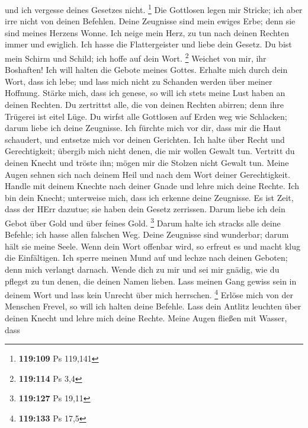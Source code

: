 und ich vergesse deines Gesetzes nicht. \footnote{\textbf{119:109} Ps
  119,141}  Die Gottlosen legen mir Stricke; ich aber irre
nicht von deinen Befehlen.  Deine Zeugnisse sind mein
ewiges Erbe; denn sie sind meines Herzens Wonne.  Ich
neige mein Herz, zu tun nach deinen Rechten immer und ewiglich.
 Ich hasse die Flattergeister und liebe dein Gesetz.
 Du bist mein Schirm und Schild; ich hoffe auf dein Wort.
\footnote{\textbf{119:114} Ps 3,4}  Weichet von mir, ihr
Boshaften! Ich will halten die Gebote meines Gottes. 
Erhalte mich durch dein Wort, dass ich lebe; und lass mich nicht zu
Schanden werden über meiner Hoffnung.  Stärke mich, dass
ich genese, so will ich stets meine Lust haben an deinen Rechten.
 Du zertrittst alle, die von deinen Rechten abirren; denn
ihre Trügerei ist eitel Lüge.  Du wirfst alle Gottlosen
auf Erden weg wie Schlacken; darum liebe ich deine Zeugnisse.
 Ich fürchte mich vor dir, dass mir die Haut schaudert,
und entsetze mich vor deinen Gerichten.  Ich halte über
Recht und Gerechtigkeit; übergib mich nicht denen, die mir wollen Gewalt
tun.  Vertritt du deinen Knecht und tröste ihn; mögen mir
die Stolzen nicht Gewalt tun.  Meine Augen sehnen sich
nach deinem Heil und nach dem Wort deiner Gerechtigkeit. 
Handle mit deinem Knechte nach deiner Gnade und lehre mich deine Rechte.
 Ich bin dein Knecht; unterweise mich, dass ich erkenne
deine Zeugnisse.  Es ist Zeit, dass der HErr dazutue; sie
haben dein Gesetz zerrissen.  Darum liebe ich dein Gebot
über Gold und über feines Gold. \footnote{\textbf{119:127} Ps 19,11}
 Darum halte ich stracks alle deine Befehle; ich hasse
allen falschen Weg.  Deine Zeugnisse sind wunderbar; darum
hält sie meine Seele.  Wenn dein Wort offenbar wird, so
erfreut es und macht klug die Einfältigen.  Ich sperre
meinen Mund auf und lechze nach deinen Geboten; denn mich verlangt
darnach.  Wende dich zu mir und sei mir gnädig, wie du
pflegst zu tun denen, die deinen Namen lieben.  Lass
meinen Gang gewiss sein in deinem Wort und lass kein Unrecht über mich
herrschen. \footnote{\textbf{119:133} Ps 17,5}  Erlöse
mich von der Menschen Frevel, so will ich halten deine Befehle.
 Lass dein Antlitz leuchten über deinen Knecht und lehre
mich deine Rechte.  Meine Augen fließen mit Wasser, dass
